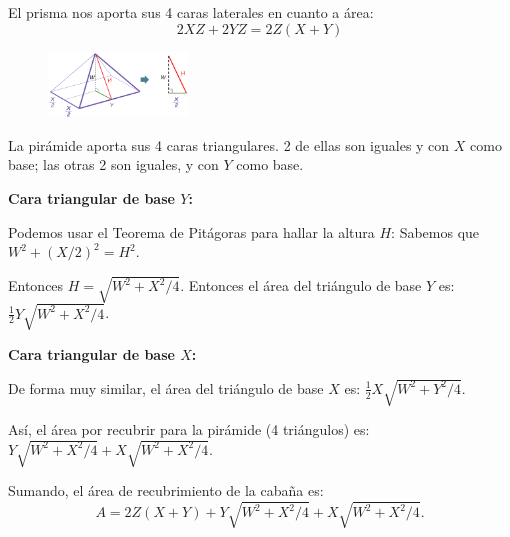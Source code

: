 \documentclass[12pt,a4paper]{article}
\begin{document}
El prisma nos aporta sus 4 caras laterales en cuanto a área:
$$2XZ + 2YZ = 2Z(X + Y)$$

\begin{figure}
\centering
\includegraphics[width=0.33\textwidth]{Figuras/fig69.png}
\end{figure}

La pirámide aporta sus 4 caras triangulares. 2 de ellas son iguales y con $X$ como base; las otras 2 son iguales, y con $Y$ como base.

\textbf{Cara triangular de base $Y$:}

Podemos usar el Teorema de Pitágoras para hallar la altura $H$: Sabemos que $W^2 + (X/2)^2 = H^2$.

Entonces $H = \sqrt{W^2 + X^2/4}$. Entonces el área del triángulo de base $Y$ es: $\frac{1}{2}Y\sqrt{W^2 + X^2/4}$.

\textbf{Cara triangular de base $X$:}

De forma muy similar, el área del triángulo de base $X$ es: $\frac{1}{2}X\sqrt{W^2 + Y^2/4}$.

Así, el área por recubrir para la pirámide (4 triángulos) es: $Y\sqrt{W^2 + X^2/4} + X\sqrt{W^2 + X^2/4}$.

Sumando, el área de recubrimiento de la cabaña es:
$$A = 2Z(X + Y) + Y\sqrt{W^2 + X^2/4} + X\sqrt{W^2 + X^2/4}.$$

\vspace{4mm}

\end{document}

